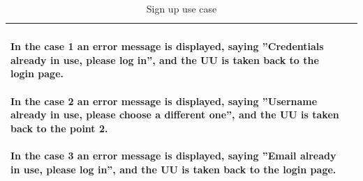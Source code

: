 \begin{table}[!h]
\begin{tabular}{lp{}}
							\paragraph{}
								In the case 1 an error message is displayed, saying ''Credentials already in use,  please log in'', and the UU is taken back to the login page.
							\paragraph{}
							\vspace{-4mm}
								In the case 2 an error message is displayed, saying ''Username already in use, please choose a different one'', and the UU is taken back to the point 2.
							\paragraph{}
							\vspace{-4mm}
								In the case 3 an error message is displayed, saying ''Email already in use, please log in'', and the UU is taken back to the login page. \\[1mm]
							\bottomrule
						\end{tabular}
						\caption{Sign up use case}
					\end{table}
					\clearpage
					\vspace{-7mm}
